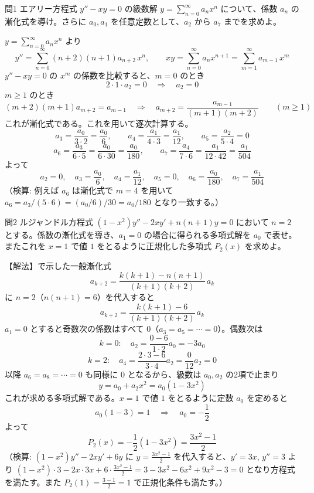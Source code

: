 \documentclass[a4paper,11pt]{article}
\begin{document}
\clearpage
\begin{mondaiboxS}{問1}
エアリー方程式 $y'' - xy = 0$ の級数解 $y = \sum_{n=0}^{\infty} a_n x^n$ について、係数 $a_n$ の漸化式を導け。さらに $a_0, a_1$ を任意定数として、$a_2$ から $a_7$ までを求めよ。
\end{mondaiboxS}
\kaitou
$y = \sum_{n=0}^{\infty} a_n x^n$ より
\[
y'' = \sum_{n=0}^{\infty} (n+2)(n+1)a_{n+2}\,x^{n}, \qquad
xy = \sum_{n=0}^{\infty} a_n x^{n+1} = \sum_{m=1}^{\infty} a_{m-1}\,x^{m}
\]
$y''-xy=0$ の $x^m$ の係数を比較すると、$m=0$ のとき
\[
2\cdot 1\cdot a_2 = 0 \quad\Longrightarrow\quad a_2 = 0
\]
$m\ge 1$ のとき
\[
(m+2)(m+1)a_{m+2} = a_{m-1}
\quad\Longrightarrow\quad
a_{m+2} = \frac{a_{m-1}}{(m+1)(m+2)} \qquad (m \ge 1)
\]
これが漸化式である。これを用いて逐次計算する。
\[
a_3 = \frac{a_0}{3\cdot 2} = \frac{a_0}{6}, \qquad
a_4 = \frac{a_1}{4\cdot 3} = \frac{a_1}{12}, \qquad
a_5 = \frac{a_2}{5\cdot 4} = 0
\]
\[
a_6 = \frac{a_3}{6\cdot 5} = \frac{a_0}{6\cdot 30} = \frac{a_0}{180}, \qquad
a_7 = \frac{a_4}{7\cdot 6} = \frac{a_1}{12\cdot 42} = \frac{a_1}{504}
\]
よって
\[
\boxed{\;
a_2 = 0,\quad a_3=\frac{a_0}{6},\quad a_4=\frac{a_1}{12},\quad a_5=0,\quad a_6=\frac{a_0}{180},\quad a_7=\frac{a_1}{504}
\;}
\]
（検算: 例えば $a_6$ は漸化式で $m=4$ を用いて $a_6 = a_3/(5\cdot 6) = (a_0/6)/30 = a_0/180$ となり一致する。）

\clearpage
\begin{mondaiboxS}{問2}
ルジャンドル方程式 $(1-x^2)y'' - 2xy' + n(n+1)y = 0$ において $n=2$ とする。係数の漸化式を導き、$a_1=0$ の場合に得られる多項式解を $a_0$ で表せ。またこれを $x=1$ で値 $1$ をとるように正規化した多項式 $P_2(x)$ を求めよ。
\end{mondaiboxS}
\kaitou
【解法】で示した一般漸化式
\[
a_{k+2} = \frac{k(k+1)-n(n+1)}{(k+1)(k+2)}\,a_k
\]
に $n=2$（$n(n+1)=6$）を代入すると
\[
a_{k+2} = \frac{k(k+1)-6}{(k+1)(k+2)}\,a_k
\]
$a_1=0$ とすると奇数次の係数はすべて $0$（$a_3=a_5=\cdots=0$）。偶数次は
\[
k=0:\quad a_2 = \frac{0-6}{1\cdot 2}a_0 = -3a_0
\]
\[
k=2:\quad a_4 = \frac{2\cdot 3 - 6}{3\cdot 4}a_2 = \frac{0}{12}a_2 = 0
\]
以降 $a_6=a_8=\cdots=0$ も同様に $0$ となるから、級数は $a_0, a_2$ の2項で止まり
\[
y = a_0 + a_2 x^{2} = a_0\left(1 - 3x^{2}\right)
\]
これが求める多項式解である。$x=1$ で値 $1$ をとるように定数 $a_0$ を定めると
\[
a_0(1-3) = 1 \quad\Longrightarrow\quad a_0 = -\frac{1}{2}
\]
よって
\[
\boxed{\; P_2(x) = -\frac{1}{2}\left(1-3x^{2}\right) = \frac{3x^{2}-1}{2} \;}
\]
（検算: $(1-x^2)y''-2xy'+6y$ に $y=\frac{3x^2-1}{2}$ を代入すると、$y'=3x$, $y''=3$ より
$(1-x^2)\cdot 3 - 2x\cdot 3x + 6\cdot\frac{3x^2-1}{2} = 3-3x^2-6x^2+9x^2-3 = 0$ となり方程式を満たす。また $P_2(1)=\frac{3-1}{2}=1$ で正規化条件も満たす。）
\end{document}

